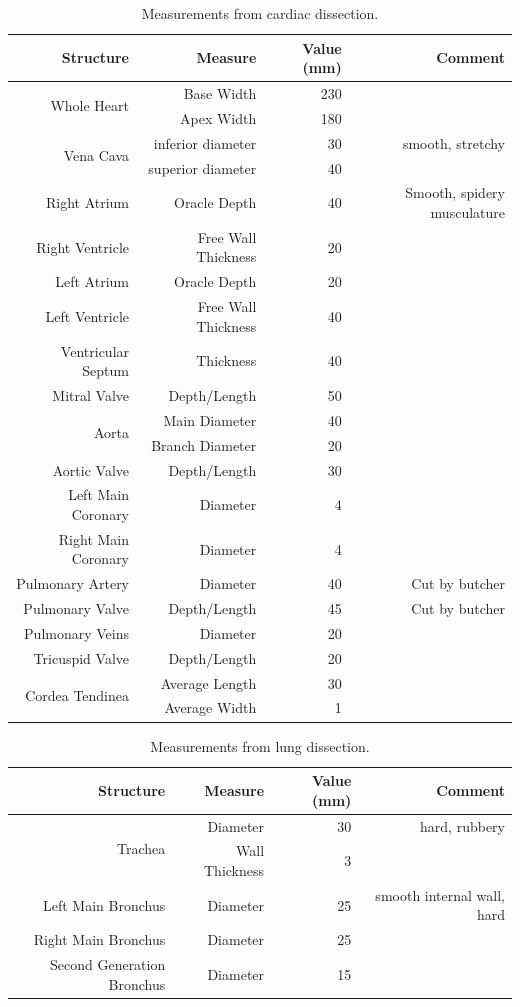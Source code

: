 \documentclass[12pt]{article}
\begin{document}
\begin{table}[h]
	\centering{}
	\caption{Measurements from cardiac dissection.}
	\label{tab:heart}
\begin{tabular}{|r|r|r|r|}
	\hline
Structure & Measure & Value (mm) & Comment\\
\hline
\hline
\multirow{2}{*}{Whole Heart}
& Base Width & 230 & \\
& Apex Width & 180 & \\
\hline
\multirow{2}{*}{Vena Cava}
& inferior diameter & 30 & smooth, stretchy \\
& superior diameter & 40 & \\
\hline
Right Atrium & Oracle Depth & 40 & Smooth, spidery musculature\\
\hline
Right Ventricle & Free Wall Thickness & 20 & \\
\hline
Left Atrium & Oracle Depth & 20 & \\
\hline
Left Ventricle & Free Wall Thickness& 40&\\
\hline
Ventricular Septum & Thickness & 40 &\\
\hline
Mitral Valve & Depth/Length & 50 &\\
\hline
\multirow{2}{*}{Aorta}
&Main Diameter& 40&\\
&Branch Diameter & 20&\\
\hline
Aortic Valve&Depth/Length&30&\\
\hline
Left Main Coronary&Diameter& 4&\\
\hline
Right Main Coronary & Diameter& 4 & \\
\hline
Pulmonary Artery&Diameter&40&Cut by butcher\\
\hline
Pulmonary Valve & Depth/Length&45&Cut by butcher\\
\hline
Pulmonary Veins&Diameter&20&\\
\hline
Tricuspid Valve&Depth/Length&20&\\
\hline
\multirow{2}{*}{Cordea Tendinea}
&Average Length& 30&\\
&Average Width & 1 &\\
\hline

\end{tabular}
\end{table}
\begin{table}[H]
	\centering{}
	\caption{Measurements from lung dissection.}
	\label{tab:lung}
	\begin{tabular}{|r|r|r|r|}
		\hline
		Structure & Measure & Value (mm) & Comment\\
		\hline
		\hline
		\multirow{2}{*}{Trachea}
		&Diameter&30&hard, rubbery\\
		&Wall Thickness&3&\\
		\hline
		Left Main Bronchus&Diameter&25&smooth internal wall, hard\\
		\hline
		Right Main Bronchus&Diameter&25&\\
		\hline
		Second Generation Bronchus&Diameter&15&\\
		\hline
		
	\end{tabular}
\end{table}
\end{document}
